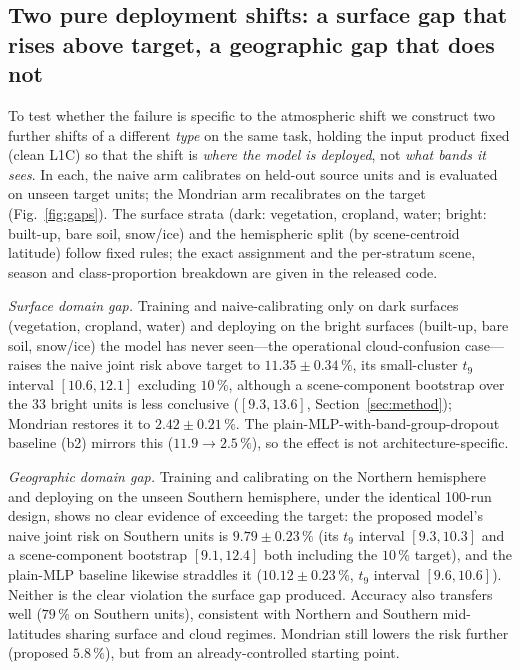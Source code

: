\documentclass[preprint,3p,times]{elsarticle}
\begin{document}
\subsection{Two pure deployment shifts: a surface gap that rises above target, a geographic gap that does not}
\label{sec:deployment}
To test whether the failure is specific to the atmospheric shift we construct two further shifts of a different \emph{type} on the same task, holding the input product fixed (clean L1C) so that the shift is \emph{where the model is deployed}, not \emph{what bands it sees}. In each, the naive arm calibrates on held-out source units and is evaluated on unseen target units; the Mondrian arm recalibrates on the target (Fig.~\ref{fig:gaps}). The surface strata (dark: vegetation, cropland, water; bright: built-up, bare soil, snow/ice) and the hemispheric split (by scene-centroid latitude) follow fixed rules; the exact assignment and the per-stratum scene, season and class-proportion breakdown are given in the released code.

\emph{Surface domain gap.} Training and naive-calibrating only on dark surfaces (vegetation, cropland, water) and deploying on the bright surfaces (built-up, bare soil, snow/ice) the model has never seen---the operational cloud-confusion case---raises the naive joint risk above target to $11.35 \pm 0.34\,\%$, its small-cluster $t_9$ interval $[10.6, 12.1]$ excluding $10\,\%$, although a scene-component bootstrap over the $33$ bright units is less conclusive ($[9.3, 13.6]$, Section~\ref{sec:method}); Mondrian restores it to $2.42 \pm 0.21\,\%$. The plain-MLP-with-band-group-dropout baseline (b2) mirrors this ($11.9 \to 2.5\,\%$), so the effect is not architecture-specific.

\emph{Geographic domain gap.} Training and calibrating on the Northern hemisphere and deploying on the unseen Southern hemisphere, under the identical 100-run design, shows no clear evidence of exceeding the target: the proposed model's naive joint risk on Southern units is $9.79 \pm 0.23\,\%$ (its $t_9$ interval $[9.3, 10.3]$ and a scene-component bootstrap $[9.1, 12.4]$ both including the $10\,\%$ target), and the plain-MLP baseline likewise straddles it ($10.12 \pm 0.23\,\%$, $t_9$ interval $[9.6, 10.6]$). Neither is the clear violation the surface gap produced. Accuracy also transfers well ($79\,\%$ on Southern units), consistent with Northern and Southern mid-latitudes sharing surface and cloud regimes. Mondrian still lowers the risk further (proposed $5.8\,\%$), but from an already-controlled starting point.
\end{document}
